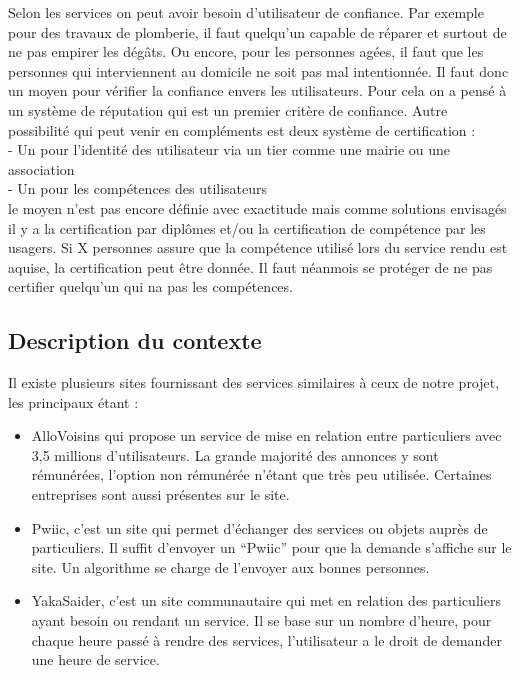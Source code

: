 \documentclass[a4paper,11pt]{article}
\begin{document}
Selon les services on peut avoir besoin d'utilisateur de confiance.
Par exemple pour des travaux de plomberie, il faut quelqu'un capable de réparer et surtout de ne pas empirer les dégâts.
Ou encore, pour les personnes agées, il faut que les personnes qui interviennent au domicile ne soit pas mal intentionnée.
Il faut donc un moyen pour vérifier la confiance envers les utilisateurs.
Pour cela on a pensé à un système de réputation qui est un premier critère de confiance.
Autre possibilité qui peut venir en compléments est deux système de certification :\\
  - Un pour l'identité des utilisateur via un tier comme une mairie ou une association\\
  - Un pour les compétences des utilisateurs\\
le moyen n'est pas encore définie avec exactitude mais comme solutions envisagés il y a la certification par diplômes et/ou la certification de compétence par les usagers.
Si X personnes assure que la compétence utilisé lors du service rendu est aquise, la certification peut être donnée.
Il faut néanmois se protéger de ne pas certifier quelqu'un qui na pas les compétences.\\




\subsection{Description du contexte}

Il existe plusieurs sites fournissant des services similaires à ceux de notre projet, les principaux étant :\\

\begin{itemize}
  \item AlloVoisins qui propose un service de mise en relation entre particuliers avec 3,5 millions
  d'utilisateurs. La grande majorité des annonces y sont rémunérées, l’option non rémunérée
  n’étant que très peu utilisée. Certaines entreprises sont aussi présentes sur le site.

  \item Pwiic, c’est un site qui permet d’échanger des services ou objets auprès de particuliers. Il suffit
  d’envoyer un “Pwiic” pour que la demande s’affiche sur le site. Un algorithme se charge de
  l’envoyer aux bonnes personnes.

  \item YakaSaider, c’est un site communautaire qui met en relation des particuliers ayant besoin ou
  rendant un service. Il se base sur un nombre d’heure, pour chaque heure passé à rendre des
  services, l’utilisateur a le droit de demander une heure de service.
\end{itemize}
\end{document}
